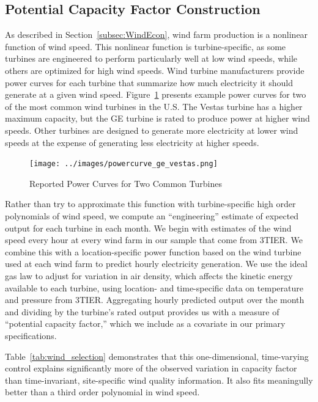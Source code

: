\documentclass[12pt]{article}
\begin{document}
\subsection{Potential Capacity Factor Construction \label{Appendix:Potential-capacity-factor}}

As described in Section~\ref{subsec:WindEcon}, wind farm production is a nonlinear function of wind speed. This nonlinear function is turbine-specific, as some turbines are engineered to perform particularly well at low wind speeds, while others are optimized for high wind speeds. Wind turbine manufacturers provide power curves for each turbine that summarize how much electricity it should generate at a given wind speed. Figure~\ref{fig:GE-powercurve} presents example power curves for two of the most common wind turbines in the U.S. The Vestas turbine has a higher maximum capacity, but the GE turbine is rated to produce power at higher wind speeds. Other turbines are designed to generate more electricity at lower wind speeds at the expense of generating less electricity at higher speeds.

\begin{figure}[h]
\caption{Reported Power Curves for Two Common Turbines \label{fig:GE-powercurve}}
\centering{}\texttt{[image: ../images/powercurve\_ge\_vestas.png]}
\end{figure}

Rather than try to approximate this function with turbine-specific high order polynomials of wind speed, we compute an ``engineering'' estimate of expected output for each turbine in each month. We begin with estimates of the wind speed every hour at every wind farm in our sample that come from 3TIER. We combine this with a location-specific power function based on the wind turbine used at each wind farm to predict hourly electricity generation. We use the ideal gas law to adjust for variation in air density, which affects the kinetic energy available to each turbine, using location- and time-specific data on temperature and pressure from 3TIER. Aggregating hourly predicted output over the month and dividing by the turbine's rated output provides us with a measure of ``potential capacity factor,'' which we include as a covariate in our primary specifications.

Table~\ref{tab:wind_selection} demonstrates that this one-dimensional, time-varying control explains significantly more of the observed variation in capacity factor than time-invariant, site-specific wind quality information. It also fits meaningully better than a third order polynomial in wind speed.
\end{document}
